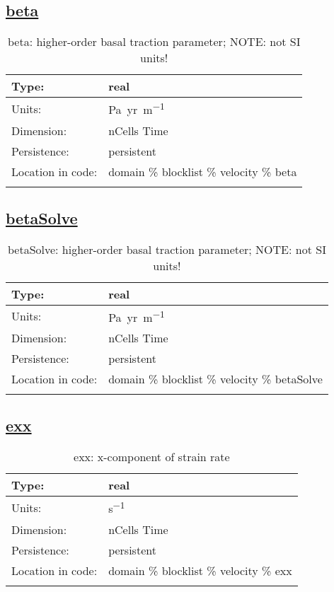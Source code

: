 \subsection[beta]{\hyperref[sec:var_tab_velocity]{beta}}
\label{subsec:var_sec_velocity_beta}
\begin{center}
\begin{longtable}{| p{2.0in} | p{4.0in} |}
        \hline 
        Type: & real \\
        \hline 
        Units: & \si{Pa.yr.m^{-1}} \\
        \hline 
        Dimension: & nCells Time \\
        \hline 
        Persistence: & persistent \\
        \hline 
         Location in code: & domain \% blocklist \% velocity \% beta \\
         \hline 
    \caption{beta: higher-order basal traction parameter; NOTE: not SI units!}
\end{longtable}
\end{center}
\subsection[betaSolve]{\hyperref[sec:var_tab_velocity]{betaSolve}}
\label{subsec:var_sec_velocity_betaSolve}
\begin{center}
\begin{longtable}{| p{2.0in} | p{4.0in} |}
        \hline 
        Type: & real \\
        \hline 
        Units: & \si{Pa.yr.m^{-1}} \\
        \hline 
        Dimension: & nCells Time \\
        \hline 
        Persistence: & persistent \\
        \hline 
         Location in code: & domain \% blocklist \% velocity \% betaSolve \\
         \hline 
    \caption{betaSolve: higher-order basal traction parameter; NOTE: not SI units!}
\end{longtable}
\end{center}
\subsection[exx]{\hyperref[sec:var_tab_velocity]{exx}}
\label{subsec:var_sec_velocity_exx}
\begin{center}
\begin{longtable}{| p{2.0in} | p{4.0in} |}
        \hline 
        Type: & real \\
        \hline 
        Units: & \si{s^{-1}} \\
        \hline 
        Dimension: & nCells Time \\
        \hline 
        Persistence: & persistent \\
        \hline 
         Location in code: & domain \% blocklist \% velocity \% exx \\
         \hline 
    \caption{exx: x-component of strain rate}
\end{longtable}
\end{center}
